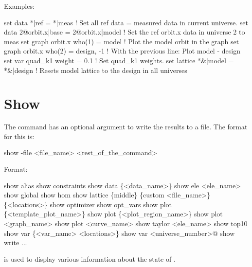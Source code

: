 Examples:
\begin{example}
  set data *|ref = *|meas                   ! Set all ref data = measured data in current universe.
  set data 2@orbit.x|base = 2@orbit.x|model ! Set the ref orbit.x data in universe 2 to meas
  set graph orbit.x who(1) = model          ! Plot the model orbit in the graph
  set graph orbit.x who(2) = design, -1     ! With the previous line: Plot model - design 
  set var quad\_k1 weight = 0.1             ! Set quad\_k1 weights. 
  set lattice *&|model = *&|design          ! Resets model lattice to the design in all universes
\end{example}

\section{Show}
\label{s:show}

The  command has an optional argument to write the results to a file.
The format for this is:
\begin{example}
  show -file <file_name> <rest_of_the_command>
\end{example}

Format:
\begin{example}
  show alias                     
  show constraints
  show data \{<data_name>\} 
  show ele <ele_name>
  show global
  show hom
  show lattice \{middle\} \{custom <file_name>\} \{<locations>\}
  show optimizer
  show opt_vars
  show plot \{<template_plot_name>\}
  show plot \{<plot_region_name>\}
  show plot <graph_name>
  show plot <curve_name>
  show taylor <ele_name>
  show top10
  show var \{<var_name> <locations>\}
  show var <universe_number>@
  show write ...
\end{example}

\vskip 0.2in  is used to display various information about
the state of \tao. 

